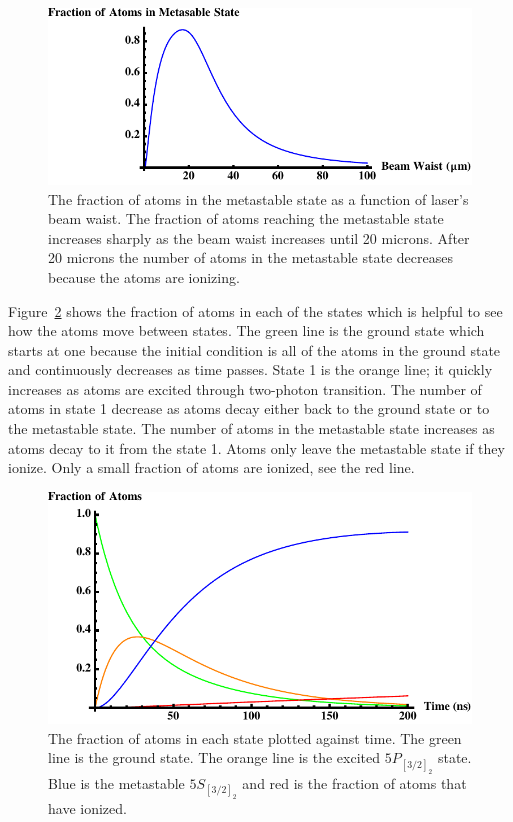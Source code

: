 \documentclass[prb,preprint]{revtex4-1}
\begin{document}
\begin{figure}[h!]
\centering
\includegraphics[width=6in]{MetaGraph1.pdf}
\caption{The fraction of atoms in the metastable state as a function of laser's beam waist. The fraction of atoms reaching the metastable state increases sharply as the beam waist increases until 20 microns. After 20 microns the number of atoms in the metastable state decreases because the atoms are ionizing.}
\label{MetaGraph1}
\end{figure}

Figure~\ref{AllGraph1} shows the fraction of atoms in each of the states which is helpful to see how the atoms move between states. The green line is the ground state which starts at one because the initial condition is all of the atoms in the ground state and continuously decreases as time passes. State 1 is the orange line; it quickly increases as atoms are excited through two-photon transition. The number of atoms in state 1 decrease as atoms decay either back to the ground state or to the metastable state. The number of atoms in the metastable state increases as atoms decay to it from the state 1. Atoms only leave the metastable state if they ionize. Only a small fraction of atoms are ionized, see the red line.

\begin{figure}[h!]
\centering
\includegraphics[width=6in]{AllGraph1.pdf}
\caption{The fraction of atoms in each state plotted against time. The green line is the ground state. The orange line is the excited $5P_{[3/2]_2}$ state. Blue is the metastable $5S_{[3/2]_2}$ and red is the fraction of atoms that have ionized.}
\label{AllGraph1}
\end{figure}
\end{document}
